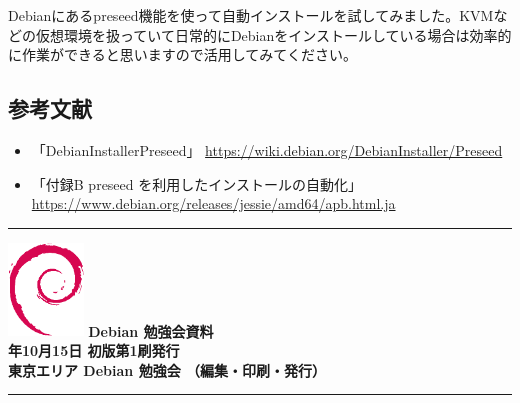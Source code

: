 \documentclass[mingoth,a4paper]{jsarticle}
\newcommand{\debmtgyear}{2016}
\newcommand{\debmtgmonth}{10}
\newcommand{\debmtgdate}{15}
\begin{document}
Debianにあるpreseed機能を使って自動インストールを試してみました。KVMなどの仮想環境を扱っていて日常的にDebianをインストールしている場合は効率的に作業ができると思いますので活用してみてください。

\subsection{参考文献}

\begin{itemize}
\item 「DebianInstallerPreseed」 \url{https://wiki.debian.org/DebianInstaller/Preseed}
\item 「付録B preseed を利用したインストールの自動化」 \url{https://www.debian.org/releases/jessie/amd64/apb.html.ja}
\end{itemize}


%
\mbox{}\newpage
\mbox{}\newpage


\vspace*{15cm}
\hrule
\vspace{2mm}
\includegraphics[width=2cm]{image200502/openlogo-nd.eps}
\noindent \Large \bf Debian 勉強会資料\\
\noindent \normalfont \debmtgyear{}年\debmtgmonth{}月\debmtgdate{}日 \hspace{5mm}  初版第1刷発行\\
\noindent \normalfont 東京エリア Debian 勉強会 （編集・印刷・発行）\\
\hrule
\end{document}
